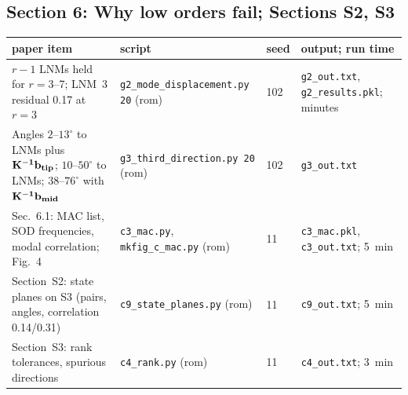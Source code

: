 \documentclass[10pt]{article}
\newcommand{\f}[1]{\texttt{#1}}
\begin{document}
\subsection*{Section 6: Why low orders fail; Sections S2, S3}
\begin{longtable}{L{0.31\textwidth}L{0.25\textwidth}L{0.08\textwidth}L{0.25\textwidth}}
\toprule
paper item & script & seed & output; run time\\ \midrule
$r-1$ LNMs held for $r=3$--7; LNM~3 residual 0.17 at $r=3$ & \f{g2\_\allowbreak{}mode\_\allowbreak{}displacement.py 20} (rom) & 102 & \f{g2\_\allowbreak{}out.txt}, \f{g2\_\allowbreak{}results.pkl}; minutes\\
Angles $2$--$13^\circ$ to LNMs plus $\bf K^{-1}b_{tip}$; $10$--$50^\circ$ to LNMs; $38$--$76^\circ$ with $\bf K^{-1}b_{mid}$ & \f{g3\_\allowbreak{}third\_\allowbreak{}direction.py 20} (rom) & 102 & \f{g3\_\allowbreak{}out.txt}\\
Sec.~6.1: MAC list, SOD frequencies, modal correlation; Fig.~4 & \f{c3\_\allowbreak{}mac.py}, \f{mkfig\_\allowbreak{}c\_\allowbreak{}mac.py} (rom) & 11 & \f{c3\_\allowbreak{}mac.pkl}, \f{c3\_\allowbreak{}out.txt}; 5~min\\
Section~S2: state planes on S3 (pairs, angles, correlation 0.14/0.31) & \f{c9\_\allowbreak{}state\_\allowbreak{}planes.py} (rom) & 11 & \f{c9\_\allowbreak{}out.txt}; 5~min\\
Section~S3: rank tolerances, spurious directions & \f{c4\_\allowbreak{}rank.py} (rom) & 11 & \f{c4\_\allowbreak{}out.txt}; 3~min\\
\bottomrule
\end{longtable}
\end{document}
